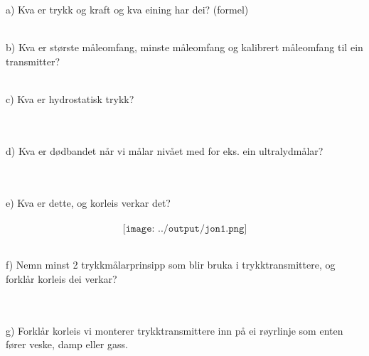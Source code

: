 

a) Kva er trykk og kraft og kva eining har dei? (formel) 
\\
\\
b) Kva er største måleomfang, minste måleomfang og kalibrert måleomfang til ein transmitter? 
\\
\\
c) Kva er hydrostatisk trykk? 
\\\\
\\
d) Kva er dødbandet når vi målar nivået med for eks. ein ultralydmålar? 
\\\\
\\
e) Kva er dette, og korleis verkar det?	 
\\\\
$$\texttt{[image: ../output/jon1.png]}$$
\\
\eject
f) Nemn minst 2 trykkmålarprinsipp som blir bruka i trykktransmittere, og forklår korleis dei verkar? 
\\\\
\\
g) Forklår korleis vi monterer trykktransmittere inn på ei røyrlinje som enten fører veske, damp eller gass. 
\\\\
\\
